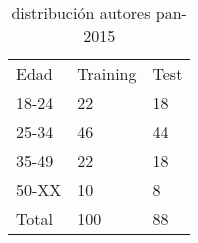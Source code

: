 \begin{table}[hp!]
\centering
\begin{tabular}{l|llllll}
\multirow{2}{*}{Edad} & \multicolumn{3}{l}{\multirow{2}{*}{Training}} & \multicolumn{3}{l}{\multirow{2}{*}{Test}} \\
                      & \multicolumn{3}{l}{}                          & \multicolumn{3}{l}{}                      \\ \hline
18-24                 & \multicolumn{3}{l}{22}                        & \multicolumn{3}{l}{18}                    \\
25-34                 & \multicolumn{3}{l}{46}                        & \multicolumn{3}{l}{44}                    \\
35-49                 & \multicolumn{3}{l}{22}                        & \multicolumn{3}{l}{18}                    \\
50-XX                 & \multicolumn{3}{l}{10}                        & \multicolumn{3}{l}{8}                     \\ \hline
Total                 & \multicolumn{3}{l}{100}                       & \multicolumn{3}{l}{88}                   
\end{tabular}
\caption{distribución autores pan-2015 }
\label{tab:pan15}
\end{table}
